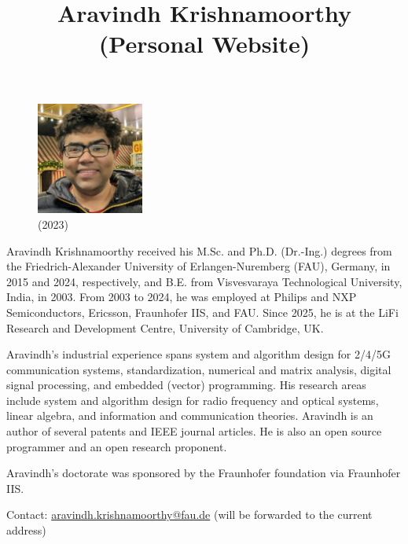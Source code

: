 \documentclass[a4paper,dvipsnames]{report}
\title{Aravindh Krishnamoorthy (Personal Website)}
\date{}
\author{}
\begin{document}
\maketitle
\begin{figure}
	\begin{center}
		\includegraphics[width=100pt,keepaspectratio]{ark_2023.jpeg}
	\end{center}
	\caption*{(2023)}
\end{figure}
\justifying \noindent Aravindh Krishnamoorthy received his M.Sc. and Ph.D. (Dr.-Ing.) degrees from the Friedrich-Alexander University of Erlangen-Nuremberg (FAU), Germany, in 2015 and 2024, respectively, and B.E. from Visvesvaraya Technological University, India, in 2003. From 2003 to 2024, he was employed at Philips and NXP Semiconductors, Ericsson, Fraunhofer IIS, and FAU. Since 2025, he is at the LiFi Research and Development Centre, University of Cambridge, UK.	
	
Aravindh's industrial experience spans system and algorithm design for 2/4/5G communication systems, standardization, numerical and matrix analysis, digital signal processing, and embedded (vector) programming. His research areas include system and algorithm design for radio frequency and optical systems, linear algebra, and information and communication theories. Aravindh is an author of several patents and IEEE journal articles. He is also an open source programmer and an open research proponent.
	
Aravindh's doctorate was sponsored by the Fraunhofer foundation via Fraunhofer IIS.

Contact: \href{mailto:aravindh.krishnamoorthy@fau.de }{aravindh.krishnamoorthy@fau.de} (will be forwarded to the current address)

\hrulefill
\end{document}

